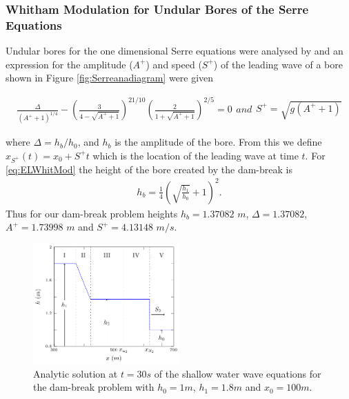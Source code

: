 \documentclass[times]{elsarticle}
\begin{document}
\subsubsection{Whitham Modulation for Undular Bores of the Serre Equations}
Undular bores for the one dimensional Serre equations were analysed by \cite{El-etal-2006} and an expression for the amplitude ($A^+$) and speed ($S^+$) of the leading wave of a bore shown in Figure \ref{fig:Serreanadiagram} were given
\begin{linenomath*}
	\begin{subequations}
\begin{gather}
\frac{\Delta}{\left(A^+ + 1\right)^{1/4}} - \left(\frac{3}{4 -  \sqrt{A^+ + 1}}\right)^{21/10} \left(\frac{2}{1 + \sqrt{A^+ + 1}}\right)^{2/5} = 0
\label{eq:aplusdef}
\end{gather}
and
\begin{gather}
S^+ = \sqrt{g \left(A^+ + 1\right)}
\label{eq:splusdef}
\end{gather}
		\label{eq:ELWhitMod}	
	\end{subequations}
\end{linenomath*}
where $\Delta = h_b / h_0$, and $h_b$ is the amplitude of the bore. From this we define $x_{S^+}(t) = x_0 + S^+t$ which is the location of the leading wave at time $t$.
For \eqref{eq:ELWhitMod} the height of the bore created by the dam-break is \cite{El-etal-2006}
\begin{gather*}
\label{eqn:hrdef}
h_b = \frac{1}{4}\left(\sqrt{\frac{h_1}{h_0}} + 1\right)^2.
\end{gather*} 
Thus for our dam-break problem heights $h_b = 1.37082$ $m$, $\Delta = 1.37082$,  $A^+ = 1.73998$ $m$ and $S^+ = 4.13148$ $m/s$.

\begin{figure}
\centering
\includegraphics[width=0.5\textwidth]{pics/explainers/SWWEana.pdf}
\caption{Analytic solution at $t=30s$ of the shallow water wave equations for the dam-break problem with $h_0 = 1m$, $h_1=1.8m$ and $x_0=100m$.}
\label{fig:SWWEanadiagram}
\end{figure}
\end{document}
